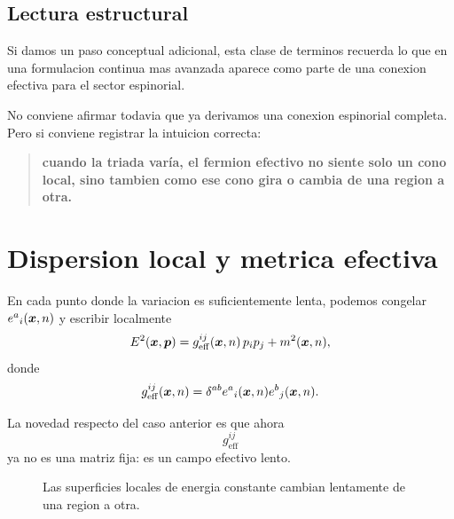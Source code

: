 \subsection{Lectura estructural}
Si damos un paso conceptual adicional, esta clase de terminos recuerda lo que en una formulacion continua mas avanzada aparece como parte de una conexion efectiva para el sector espinorial.

No conviene afirmar todavia que ya derivamos una conexion espinorial completa. Pero si conviene registrar la intuicion correcta:
\begin{quote}
\textbf{cuando la triada varía, el fermion efectivo no siente solo un cono local, sino tambien como ese cono gira o cambia de una region a otra.}
\end{quote}

\section{Dispersion local y metrica efectiva}
En cada punto donde la variacion es suficientemente lenta, podemos congelar \(e^a{}_i(\bm{x},n)\) y escribir localmente
\begin{equation}
E^2(\bm{x},\bm{p})
=
g_{\mathrm{eff}}^{ij}(\bm{x},n)\,p_i p_j + m^2(\bm{x},n),
\end{equation}
donde
\begin{equation}
g_{\mathrm{eff}}^{ij}(\bm{x},n)
=
\delta^{ab} e^a{}_i(\bm{x},n)e^b{}_j(\bm{x},n).
\label{c23:eq:metricVariable}
\end{equation}

La novedad respecto del caso anterior es que ahora
\begin{equation}
g_{\mathrm{eff}}^{ij}
\end{equation}
ya no es una matriz fija: es un campo efectivo lento.

\begin{figure}[h!]
\centering
{}
\caption{Las superficies locales de energia constante cambian lentamente de una region a otra.}
\end{figure}

